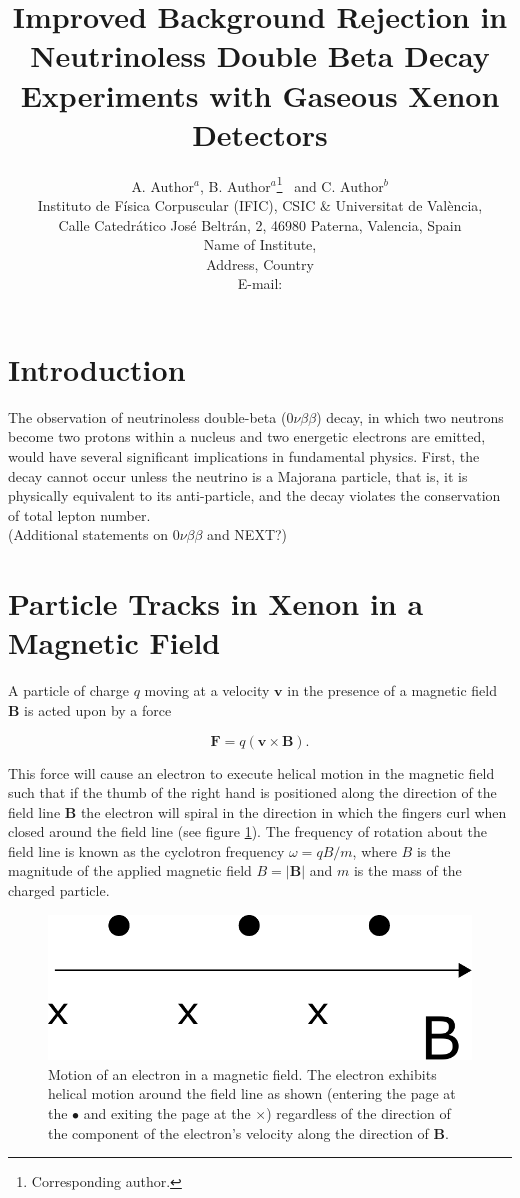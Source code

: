 \documentclass{JINST}
\title{Improved Background Rejection in Neutrinoless Double Beta Decay Experiments with Gaseous Xenon Detectors}
\author{A. Author$^a$,
B. Author$^a$\thanks{Corresponding author.}~
and C. Author$^b$\\
\llap{$^a$}Instituto de F\'isica Corpuscular (IFIC), CSIC \& Universitat de Val\`encia,\\ 
Calle Catedr\'atico Jos\'e Beltr\'an, 2, 46980 Paterna, Valencia, Spain\\
\llap{$^b$}Name of Institute,\\
  Address, Country\\
E-mail: \email{CorrespondingAuthor@email.com}}
\begin{document}
\section{Introduction}\label{sec:intro}
The observation of neutrinoless double-beta ($0\nu\beta\beta$) decay, in which two neutrons become two protons within a nucleus and two energetic electrons are emitted, would have several significant implications in fundamental physics.  First, the decay cannot occur unless the neutrino is a Majorana particle, that is, it is physically equivalent to its anti-particle, and the decay violates the conservation of total lepton number.\\

(Additional statements on $0\nu\beta\beta$ and NEXT?)

\section{Particle Tracks in Xenon in a Magnetic Field}\label{sec:magmotion}
A particle of charge $q$ moving at a velocity $\mathbf{v}$ in the presence of a magnetic field $\mathbf{B}$ is acted upon by a force

\begin{equation}
\mathbf{F} = q(\mathbf{v} \times \mathbf{B}).
\end{equation}

This force will cause an electron to execute helical motion in the magnetic field such that if the thumb of the right hand is positioned along the direction of the field line $\mathbf{B}$ the electron will spiral in the direction in which the fingers curl when closed around the field line (see figure \ref{fig_bfieldmotion}).  The frequency of rotation about the field line is known as the cyclotron frequency $\omega = qB/m$, where $B$ is the magnitude of the applied magnetic field $B = |\mathbf{B}|$ and $m$ is the mass of the charged particle.  

\begin{figure}[!htb]
	\centering
	\includegraphics[scale=0.48]{fig/bfield_motion.pdf}
	\caption{\label{fig_bfieldmotion}Motion of an electron in a magnetic field.  The electron exhibits helical motion around the field line as shown (entering the page at the $\bullet$ and exiting the page at the $\times$) regardless of the direction of the component of the electron's velocity along the direction of $\mathbf{B}$.}
\end{figure}
\end{document}
